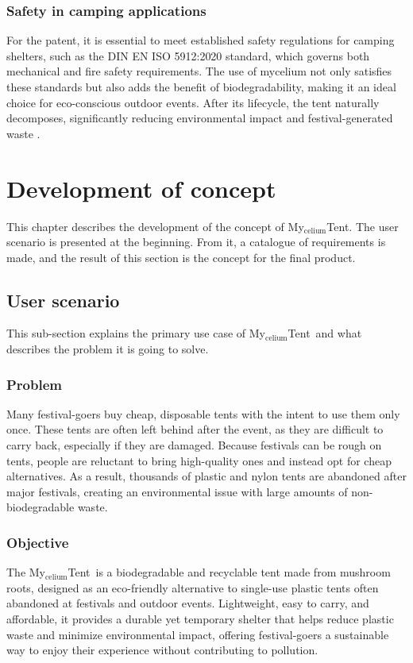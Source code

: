 \documentclass{article}
\newcommand{\myc}{My$_{\text{celium}}$Tent}
\begin{document}
\subsubsection{Safety in camping applications}
For the patent, it is essential to meet established safety regulations for camping
shelters, such as the DIN EN ISO 5912:2020 standard, which governs both mechanical and
fire safety requirements. The use of mycelium not only satisfies these standards but also
adds the benefit of biodegradability, making it an ideal choice for eco-conscious outdoor
events. After its lifecycle, the tent naturally decomposes, significantly reducing
environmental impact and festival-generated waste \parencite{din2020}.

\newpage
\section{Development of concept}
This chapter describes the development of the concept of \myc.
The user scenario is presented at the beginning. From it, a catalogue
of requirements is made, and the result of this section is the
concept for the final product.

\subsection{User scenario}
This sub-section explains the primary use case of \myc\ and what describes the
problem it is going to solve. 

\subsubsection{Problem}
Many festival-goers buy cheap, disposable tents with the intent to use them only once.
These tents are often left behind after the event, as they are difficult to carry back,
especially if they are damaged. Because festivals can be rough on tents, people are
reluctant to bring high-quality ones and instead opt for cheap alternatives. As a result,
thousands of plastic and nylon tents are abandoned after major festivals, creating an
environmental issue with large amounts of non-biodegradable waste.

\subsubsection{Objective}
The \myc\ is a biodegradable and recyclable tent made from mushroom roots,
designed as an eco-friendly alternative to single-use plastic tents often abandoned at
festivals and outdoor events. Lightweight, easy to carry, and affordable, it provides a
durable yet temporary shelter that helps reduce plastic waste and minimize
environmental impact, offering festival-goers a sustainable way to enjoy their experience
without contributing to pollution.
\end{document}

